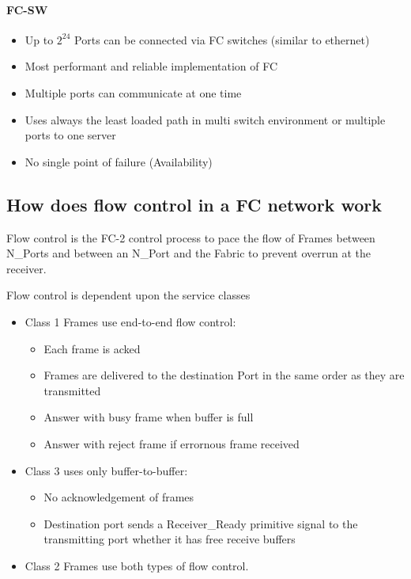 \documentclass{article}
\begin{document}
\paragraph{FC-SW}
\begin{itemize}
	\item Up to $2^24$ Ports can be connected via FC switches (similar to ethernet)
	\item Most performant and reliable implementation of FC
	\item Multiple ports can communicate at one time
	\item Uses always the least loaded path in multi switch environment or multiple ports to one server
	\item No single point of failure (Availability)
\end{itemize}


\newpage
\subsection{How does flow control in a FC network work}
Flow control is the FC-2 control process to pace the flow of Frames between N\_Ports and between an N\_Port and the Fabric to prevent overrun at the receiver. 


Flow control is dependent upon the service classes  

\begin{itemize}
	\item Class 1 Frames use end-to-end flow control: 
		\begin{itemize}
			\item Each frame is acked
			\item Frames are delivered to the destination Port in the same order as they are transmitted
			\item Answer with busy frame when buffer is full
			\item Answer with reject frame if errornous frame received
		\end{itemize}
	\item Class 3 uses only buffer-to-buffer: 
		\begin{itemize}
			\item No acknowledgement of frames 
			\item Destination port sends a Receiver\_Ready primitive signal to the transmitting port whether it has free receive buffers
		\end{itemize}
	\item Class 2 Frames use both types of flow control.
\end{itemize}
\end{document}
